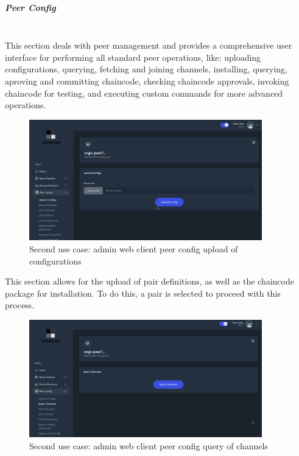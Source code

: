 \subparagraph{Peer Config}\mbox{}\\
This section deals with peer management and provides a comprehensive user interface for performing all standard peer operations, like: uploading configurations, querying, fetching and joining channels, installing, querying, aproving and committing chaincode, checking chaincode approvals, invoking chaincode for testing, and executing custom commands for more advanced operations.

\begin{figure}[H]
    \centering
    \includegraphics[width=0.9\textwidth]{assets/use-case-2/peer-config-upload-configs.png} %
    \caption{Second use case: admin web client peer config upload of configurations}
    \label{fig:sample-image} 
\end{figure}

This section allows for the upload of pair definitions, as well as the chaincode package for installation. To do this, a pair is selected to proceed with this process.

\begin{figure}[H]
    \centering
    \includegraphics[width=0.9\textwidth]{assets/use-case-2/peer-config-query-channels.png} %
    \caption{Second use case: admin web client peer config query of channels}
    \label{fig:sample-image} 
\end{figure}

